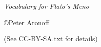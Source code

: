 \begin{titlepage}
\clearpage
\vspace*{\fill}
\begin{center}
\huge \textit{Vocabulary for Plato's \textit{Meno}}

\vskip2in

\large \copyright Peter Aronoff \the\year

(See CC-BY-SA.txt for details)
\end{center}
\vfill %
\end{titlepage}
